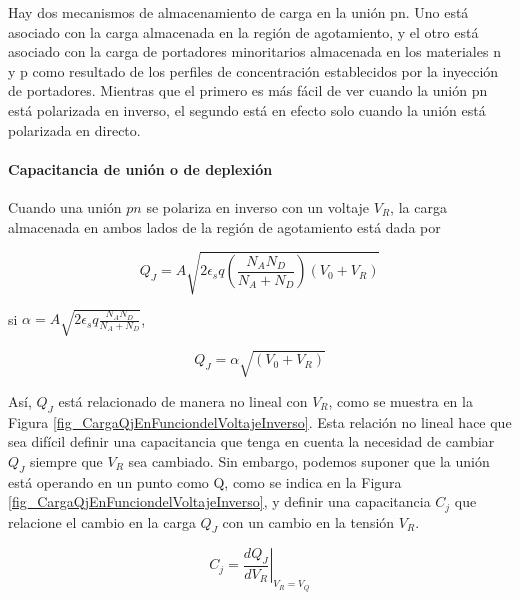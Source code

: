 Hay dos mecanismos de almacenamiento de carga en la unión pn. Uno está asociado con la carga almacenada en la región de agotamiento, y el otro está asociado con la carga de portadores minoritarios almacenada en los materiales n y p como resultado de los perfiles de concentración establecidos por la inyección de portadores. Mientras que el primero es más fácil de ver cuando la unión pn está polarizada en inverso, el segundo está en efecto solo cuando la unión está polarizada en directo.

\paragraph*{Capacitancia de unión o de deplexión}

Cuando una unión $pn$ se polariza en inverso con un voltaje $V_R$, la carga almacenada en ambos lados de la región de agotamiento está dada por 

\begin{equation*}
Q_J = A \sqrt{2 \epsilon_s q \left( \frac{N_A N_D}{N_A + N_D} \right) \left( V_0 + V_R \right)}
\end{equation*}

si $\alpha = A \sqrt{2 \epsilon_s q \frac{N_A N_D}{N_A + N_D}}$, 

\begin{equation*}
Q_J = \alpha \sqrt{\left( V_0 + V_R \right)}
\end{equation*}

Así, \( Q_J \) está relacionado de manera no lineal con \( V_R \), como se muestra en la Figura \ref{fig_CargaQjEnFunciondelVoltajeInverso}. Esta relación no lineal hace que sea difícil definir una capacitancia que tenga en cuenta la necesidad de cambiar \( Q_J \) siempre que \( V_R \) sea cambiado. Sin embargo, podemos suponer que la unión está operando en un punto como Q, como se indica en la Figura \ref{fig_CargaQjEnFunciondelVoltajeInverso}, y definir una capacitancia \( C_j \) que relacione el cambio en la carga \( Q_J \) con un cambio en la tensión \( V_R \).

\begin{equation*}
C_j = \left. \frac{d Q_J}{d V_R}\right|_{V_R = V_Q}
\end{equation*}

